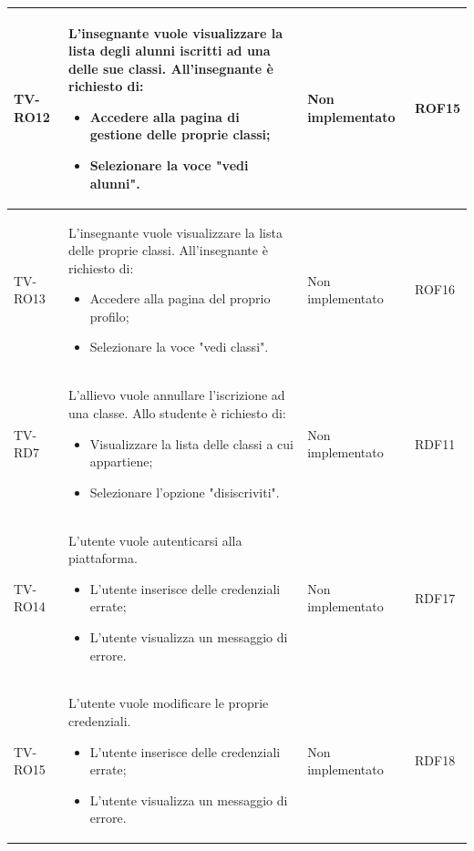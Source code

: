 \begin{longtable}{|>{\centering\arraybackslash}m{1.6cm}|>{\centering\arraybackslash}m{6.41cm}|>{\centering\arraybackslash}m{3.1cm} | >{\centering\arraybackslash}m{2.6cm}|}
		TV-RO12 & L'insegnante vuole visualizzare la lista degli alunni iscritti ad una delle sue classi. All'insegnante è richiesto di:
		\begin{itemize}
			\item Accedere alla pagina di gestione delle proprie classi;
			\item Selezionare la voce "vedi alunni".		
		\end{itemize}& Non implementato  & ROF15 \\ \hline
		
		  \rowcolor{LightGray}
		TV-RO13 & L'insegnante vuole visualizzare la lista delle proprie classi. All'insegnante è richiesto di:
		\begin{itemize}
			\item Accedere alla pagina del proprio profilo;
			\item Selezionare la voce "vedi classi".		
		\end{itemize} & Non implementato & ROF16 \\ \hline
		
		TV-RD7 & L'allievo vuole annullare l'iscrizione ad una classe. Allo studente è richiesto di:
		\begin{itemize}
			\item Visualizzare la lista delle classi a cui appartiene;
			\item Selezionare l'opzione "disiscriviti".		
		\end{itemize}& Non implementato  & RDF11 \\ \hline
		
		  \rowcolor{LightGray}
		TV-RO14 & L'utente vuole autenticarsi alla piattaforma. 
		\begin{itemize}
			\item L'utente inserisce delle credenziali errate;
			\item L'utente visualizza un messaggio di errore.
		\end{itemize} & Non implementato & RDF17 \\ \hline
		
		TV-RO15 & L'utente vuole modificare le proprie credenziali. 
		\begin{itemize}
			\item L'utente inserisce delle credenziali errate;
			\item L'utente visualizza un messaggio di errore.
		\end{itemize} & Non implementato & RDF18 \\ \hline
		

\end{longtable}
